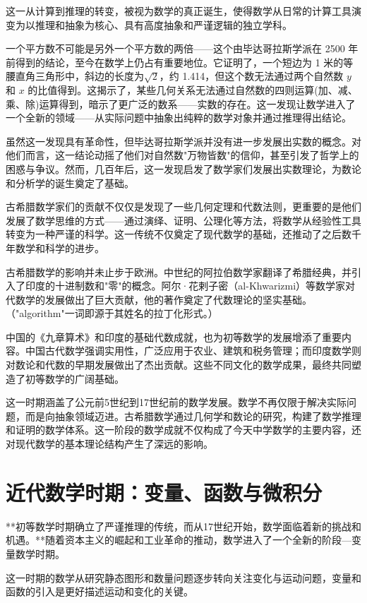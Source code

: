 这一从计算到推理的转变，被视为数学的真正诞生，使得数学从日常的计算工具演变为以推理和抽象为核心、具有高度抽象和严谨逻辑的独立学科。

一个平方数不可能是另外一个平方数的两倍——这个由毕达哥拉斯学派在 2500 年前得到的结论，至今在数学上仍占有重要地位。它证明了，一个短边为 1 米的等腰直角三角形中，斜边的长度为$\sqrt{2}$，约 1.414，但这个数无法通过两个自然数 $y$ 和 $x$ 的比值得到。这揭示了，某些几何关系无法通过自然数的四则运算(加、减、乘、除)运算得到，暗示了更广泛的数系——实数的存在。这一发现让数学进入了一个全新的领域——从实际问题中抽象出纯粹的数学对象并通过推理得出结论。

虽然这一发现具有革命性，但毕达哥拉斯学派并没有进一步发展出实数的概念。对他们而言，这一结论动摇了他们对自然数"万物皆数"的信仰，甚至引发了哲学上的困惑与争议。然而，几百年后，这一发现启发了数学家们发展出实数理论，为数论和分析学的诞生奠定了基础。

古希腊数学家们的贡献不仅仅是发现了一些几何定理和代数法则，更重要的是他们发展了数学思维的方式——通过演绎、证明、公理化等方法，将数学从经验性工具转变为一种严谨的科学。这一传统不仅奠定了现代数学的基础，还推动了之后数千年数学和科学的进步。

古希腊数学的影响并未止步于欧洲。中世纪的阿拉伯数学家翻译了希腊经典，并引入了印度的十进制数和"零"的概念。阿尔·花剌子密（al-Khwarizmi）等数学家对代数学的发展做出了巨大贡献，他的著作奠定了代数理论的坚实基础。（"algorithm"一词即源于其姓名的拉丁化形式。）

中国的《九章算术》和印度的基础代数成就，也为初等数学的发展增添了重要内容。中国古代数学强调实用性，广泛应用于农业、建筑和税务管理；而印度数学则对数论和代数的早期发展做出了杰出贡献。这些不同文化的数学成果，最终共同塑造了初等数学的广阔基础。

这一时期涵盖了公元前5世纪到17世纪前的数学发展。数学不再仅限于解决实际问题，而是向抽象领域迈进。古希腊数学通过几何学和数论的研究，构建了数学推理和证明的数学体系。这一阶段的数学成就不仅构成了今天中学数学的主要内容，还对现代数学的基本理论结构产生了深远的影响。


\section{近代数学时期：变量、函数与微积分}

**初等数学时期确立了严谨推理的传统，而从17世纪开始，数学面临着新的挑战和机遇。**随着资本主义的崛起和工业革命的推动，数学进入了一个全新的阶段---变量数学时期。

这一时期的数学从研究静态图形和数量问题逐步转向关注变化与运动问题，变量和函数的引入是更好描述运动和变化的关键。

